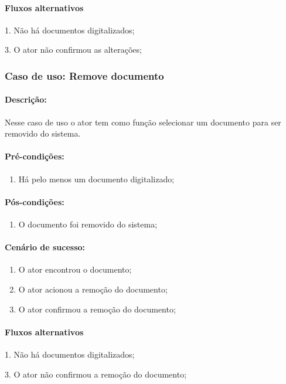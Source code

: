 \paragraph{Fluxos alternativos}
\begin{description}
    \item 1. Não há documentos digitalizados; 
    \item 3. O ator não confirmou as alterações;
\end{description}


\newpage
\subsubsection{Caso de uso: Remove documento}

\paragraph{Descrição:} Nesse caso de uso o ator tem como função selecionar um documento para ser removido do sistema.

\paragraph{Pré-condições:}
\begin{enumerate}
    \item Há pelo menos um documento digitalizado;
\end{enumerate}

\paragraph{Pós-condições:} 
\begin{enumerate}
    \item O documento foi removido do sistema;
\end{enumerate}
    
\paragraph{Cenário de sucesso:}
\begin{enumerate}
    \item O ator encontrou o documento;
    \item O ator acionou a remoção do documento;
    \item O ator confirmou a remoção do documento;
\end{enumerate}

\paragraph{Fluxos alternativos}
\begin{description}
    \item 1. Não há documentos digitalizados;
    \item 3. O ator não confirmou a remoção do documento;
\end{description}

